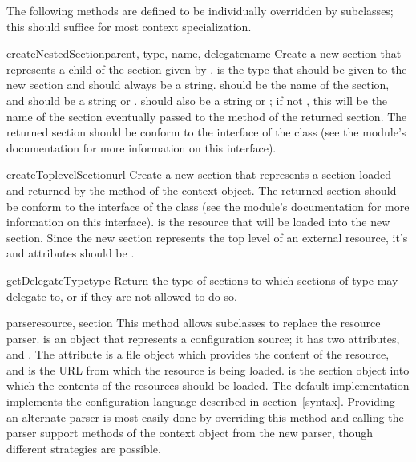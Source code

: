\documentclass{howto}
\begin{document}
The following methods are defined to be individually overridden by
subclasses; this should suffice for most context specialization.

\begin{methoddesc}{createNestedSection}{parent, type, name, delegatename}
  Create a new section that represents a child of the section given by
  .   is the type that should be given to the
  new section and should always be a string.   should be the
  name of the section, and should be a string or .
   should also be a string or ; if not
  , this will be the name of the section eventually passed
  to the  method of the returned section.  The
  returned section should be conform to the interface of the
   class (see the 
  module's documentation for more information on this interface).
\end{methoddesc}

\begin{methoddesc}{createToplevelSection}{url}
  Create a new section that represents a section loaded and returned
  by the  method of the context object.  The returned
  section should be conform to the interface of the
   class (see the
   module's documentation for more
  information on this interface).   is the resource that will
  be loaded into the new section.
  Since the new section represents the top level of an external
  resource, it's  and  attributes should be
  .
\end{methoddesc}

\begin{methoddesc}{getDelegateType}{type}
  Return the type of sections to which sections of type  may
  delegate to, or  if they are not allowed to do so.
\end{methoddesc}

\begin{methoddesc}{parse}{resource, section}
  This method allows subclasses to replace the resource parser.
   is an object that represents a configuration source;
  it has two attributes,  and .  The
   attribute is a file object which provides the content
  of the resource, and  is the URL from which the resource
  is being loaded.   is the section object into which the
  contents of the resources should be loaded.  The default
  implementation implements the configuration language described in
  section~\ref{syntax}.  Providing an
  alternate parser is most easily done by overriding this method and
  calling the parser support methods of the context object from the
  new parser, though different strategies are possible.
\end{methoddesc}
\end{document}
